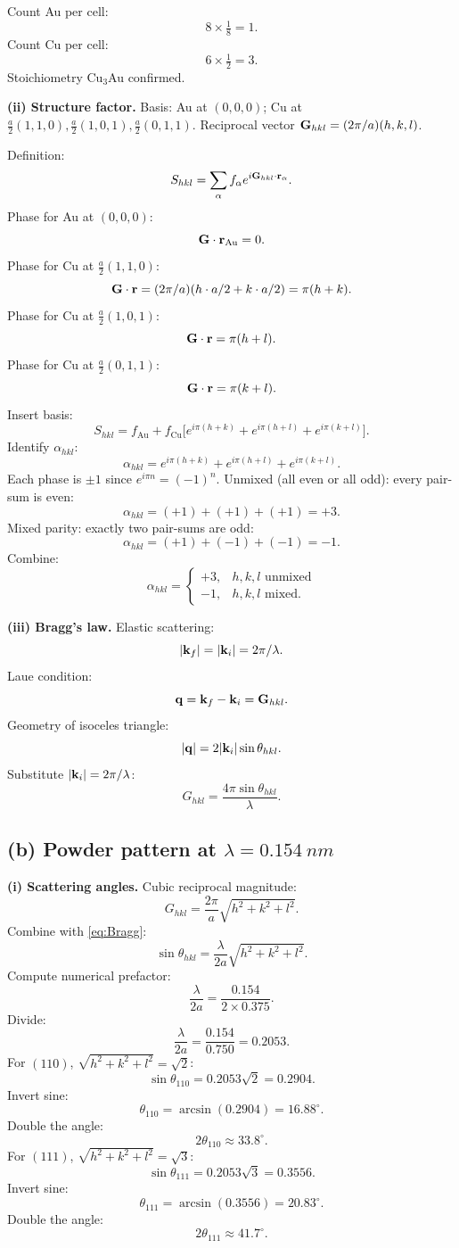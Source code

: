 \documentclass[11pt]{article}
\begin{document}
Count Au per cell:
\[ 8\times\tfrac{1}{8}=1. \]
Count Cu per cell:
\[ 6\times\tfrac{1}{2}=3. \]
Stoichiometry Cu$_3$Au confirmed.

\textbf{(ii) Structure factor.} Basis: Au at $(0,0,0)$; Cu at $\tfrac{a}{2}(1,1,0),\tfrac{a}{2}(1,0,1),\tfrac{a}{2}(0,1,1)$. Reciprocal vector $\vb G_{hkl}=(2\pi/a)(h,k,l)$.

Definition:
\[ S_{hkl}=\sum_\alpha f_\alpha e^{i\vb G_{hkl}\cdot\vb r_\alpha}. \]
Phase for Au at $(0,0,0)$:
\[ \vb G\cdot\vb r_{\text{Au}}=0. \]
Phase for Cu at $\tfrac{a}{2}(1,1,0)$:
\[ \vb G\cdot\vb r=(2\pi/a)(h\cdot a/2+k\cdot a/2)=\pi(h+k). \]
Phase for Cu at $\tfrac{a}{2}(1,0,1)$:
\[ \vb G\cdot\vb r=\pi(h+l). \]
Phase for Cu at $\tfrac{a}{2}(0,1,1)$:
\[ \vb G\cdot\vb r=\pi(k+l). \]
Insert basis:
\begin{equation}
S_{hkl}=f_{\text{Au}}+f_{\text{Cu}}\bigl[e^{i\pi(h+k)}+e^{i\pi(h+l)}+e^{i\pi(k+l)}\bigr].
\label{eq:Shkl}
\end{equation}
Identify $\alpha_{hkl}$:
\[ \alpha_{hkl}=e^{i\pi(h+k)}+e^{i\pi(h+l)}+e^{i\pi(k+l)}. \]
Each phase is $\pm 1$ since $e^{i\pi n}=(-1)^n$. Unmixed (all even or all odd): every pair-sum is even:
\[ \alpha_{hkl}=(+1)+(+1)+(+1)=+3. \]
Mixed parity: exactly two pair-sums are odd:
\[ \alpha_{hkl}=(+1)+(-1)+(-1)=-1. \]
Combine:
\begin{equation}
\boxed{\;\alpha_{hkl}=\begin{cases}+3, & h,k,l\text{ unmixed}\\ -1, & h,k,l\text{ mixed}.\end{cases}\;}
\label{eq:alpha}
\end{equation}

\textbf{(iii) Bragg's law.} Elastic scattering:
\[ |\vb k_f|=|\vb k_i|=2\pi/\lambda. \]
Laue condition:
\[ \vb q=\vb k_f-\vb k_i=\vb G_{hkl}. \]
Geometry of isoceles triangle:
\[ |\vb q|=2|\vb k_i|\sin\theta_{hkl}. \]
Substitute $|\vb k_i|=2\pi/\lambda$:
\begin{equation}
\boxed{\;G_{hkl}=\frac{4\pi\sin\theta_{hkl}}{\lambda}.\;}
\label{eq:Bragg}
\end{equation}

\subsection*{(b) Powder pattern at $\lambda=\SI{0.154}{nm}$}

\textbf{(i) Scattering angles.} Cubic reciprocal magnitude:
\[ G_{hkl}=\frac{2\pi}{a}\sqrt{h^2+k^2+l^2}. \]
Combine with \eqref{eq:Bragg}:
\[ \sin\theta_{hkl}=\frac{\lambda}{2a}\sqrt{h^2+k^2+l^2}. \]
Compute numerical prefactor:
\[ \frac{\lambda}{2a}=\frac{0.154}{2\times 0.375}. \]
Divide:
\[ \frac{\lambda}{2a}=\frac{0.154}{0.750}=0.2053. \]
For $(110)$, $\sqrt{h^2+k^2+l^2}=\sqrt2$:
\[ \sin\theta_{110}=0.2053\sqrt{2}=0.2904. \]
Invert sine:
\[ \theta_{110}=\arcsin(0.2904)=16.88^\circ. \]
Double the angle:
\[ \boxed{\;2\theta_{110}\approx 33.8^\circ.\;} \]
For $(111)$, $\sqrt{h^2+k^2+l^2}=\sqrt3$:
\[ \sin\theta_{111}=0.2053\sqrt{3}=0.3556. \]
Invert sine:
\[ \theta_{111}=\arcsin(0.3556)=20.83^\circ. \]
Double the angle:
\[ \boxed{\;2\theta_{111}\approx 41.7^\circ.\;} \]
\end{document}
